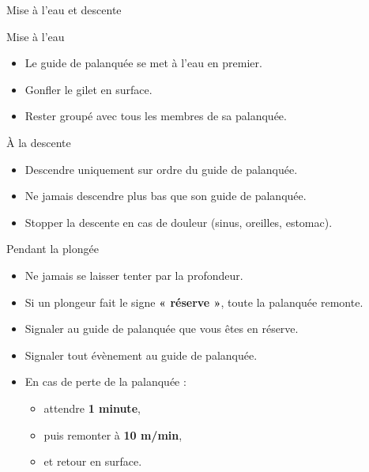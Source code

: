 \begin{frame}{Mise à l’eau et descente}
\begin{block}{Mise à l’eau}
\begin{itemize}
  \item Le guide de palanquée se met à l’eau en premier.
  \item Gonfler le gilet en surface.
  \item Rester groupé avec tous les membres de sa palanquée.
\end{itemize}
\end{block}

\vspace{0.2cm}

\begin{block}{À la descente}
\begin{itemize}
  \item Descendre uniquement sur ordre du guide de palanquée.
  \item \alert{Ne jamais descendre plus bas que son guide de palanquée}.
  \item Stopper la descente en cas de douleur
        (sinus, oreilles, estomac).
\end{itemize}
\end{block}
\end{frame}

\begin{frame}{Pendant la plongée}
\begin{itemize}
  \item Ne jamais se laisser tenter par la profondeur.
  \item Si un plongeur fait le signe \textbf{« réserve »},
        \alert{toute la palanquée remonte}.
  \item Signaler au guide de palanquée que vous êtes en réserve.
  \item Signaler tout évènement au guide de palanquée.
  \item En cas de perte de la palanquée :
        \begin{itemize}
          \item attendre \textbf{1 minute},
          \item puis remonter à \textbf{10 m/min},
          \item et retour en surface.
        \end{itemize}
\end{itemize}
\end{frame}

